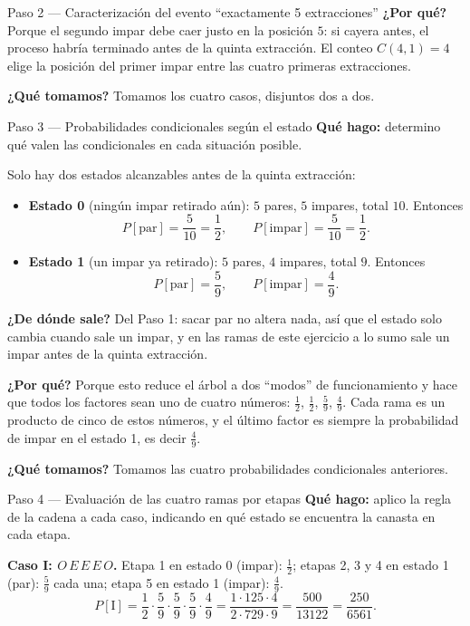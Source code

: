 \documentclass[11pt]{article}
\begin{document}
\begin{sol}
\begin{paso}{Paso 2 --- Caracterizaci\'on del evento ``exactamente 5 extracciones''}
\textbf{¿Por qu\'e?} Porque el segundo impar debe caer justo en la posici\'on $5$: si cayera antes, el proceso habr\'ia terminado antes de la quinta extracci\'on. El conteo $C(4,1)=4$ elige la posici\'on del primer impar entre las cuatro primeras extracciones.

\textbf{¿Qu\'e tomamos?} Tomamos los cuatro casos, disjuntos dos a dos.
\end{paso}

\begin{paso}{Paso 3 --- Probabilidades condicionales seg\'un el estado}
\textbf{Qu\'e hago:} determino qu\'e valen las condicionales en cada situaci\'on posible.

Solo hay dos estados alcanzables antes de la quinta extracci\'on:
\begin{itemize}[leftmargin=*]
  \item \textbf{Estado 0} (ning\'un impar retirado a\'un): $5$ pares, $5$ impares, total $10$. Entonces
  \[
  P[\text{par}]=\frac{5}{10}=\frac{1}{2},
  \qquad
  P[\text{impar}]=\frac{5}{10}=\frac{1}{2}.
  \]
  \item \textbf{Estado 1} (un impar ya retirado): $5$ pares, $4$ impares, total $9$. Entonces
  \[
  P[\text{par}]=\frac{5}{9},
  \qquad
  P[\text{impar}]=\frac{4}{9}.
  \]
\end{itemize}

\textbf{¿De d\'onde sale?} Del Paso 1: sacar par no altera nada, as\'i que el estado solo cambia cuando sale un impar, y en las ramas de este ejercicio a lo sumo sale un impar antes de la quinta extracci\'on.

\textbf{¿Por qu\'e?} Porque esto reduce el \'arbol a dos ``modos'' de funcionamiento y hace que todos los factores sean uno de cuatro n\'umeros: $\frac{1}{2}$, $\frac{1}{2}$, $\frac{5}{9}$, $\frac{4}{9}$. Cada rama es un producto de cinco de estos n\'umeros, y el \'ultimo factor es siempre la probabilidad de impar en el estado 1, es decir $\frac{4}{9}$.

\textbf{¿Qu\'e tomamos?} Tomamos las cuatro probabilidades condicionales anteriores.
\end{paso}

\begin{paso}{Paso 4 --- Evaluaci\'on de las cuatro ramas por etapas}
\textbf{Qu\'e hago:} aplico la regla de la cadena a cada caso, indicando en qu\'e estado se encuentra la canasta en cada etapa.

\textbf{Caso I: $O\,E\,E\,E\,O$.} Etapa 1 en estado 0 (impar): $\frac{1}{2}$; etapas 2, 3 y 4 en estado 1 (par): $\frac{5}{9}$ cada una; etapa 5 en estado 1 (impar): $\frac{4}{9}$.
\[
P[\text{I}]=\frac{1}{2}\cdot\frac{5}{9}\cdot\frac{5}{9}\cdot\frac{5}{9}\cdot\frac{4}{9}
=\frac{1\cdot 125\cdot 4}{2\cdot 729\cdot 9}
=\frac{500}{13122}=\frac{250}{6561}.
\]


\end{paso}
\end{sol}
\end{document}
